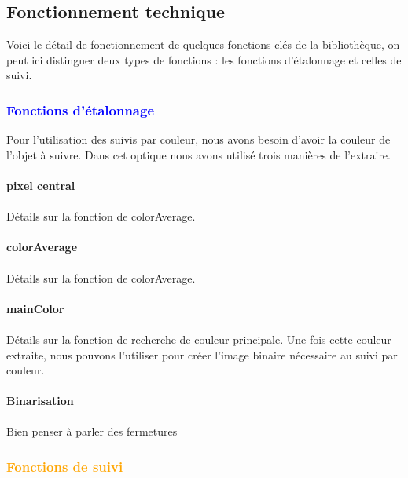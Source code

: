 \documentclass{report}
\begin{document}
				\subsection{Fonctionnement technique}
					Voici le détail de fonctionnement de quelques fonctions clés de la bibliothèque, on peut ici distinguer deux types de fonctions : les fonctions d'étalonnage et celles de suivi.
					\subsubsection{\textcolor{blue}{Fonctions d'étalonnage}}
						Pour l'utilisation des suivis par couleur, nous avons besoin d'avoir la couleur de l'objet à suivre. Dans cet optique nous avons utilisé trois manières de l'extraire.
						\paragraph{pixel central} \paragraph{}
						Détails sur la fonction de colorAverage.
						\paragraph{colorAverage} \paragraph{}
						Détails sur la fonction de colorAverage.
						\paragraph{mainColor} \paragraph{}
						Détails sur la fonction de recherche de couleur principale.
						Une fois cette couleur extraite, nous pouvons l'utiliser pour créer l'image binaire nécessaire au suivi par couleur.
						\paragraph{Binarisation} \paragraph{}
							Bien penser à parler des fermetures
					\subsubsection{\textcolor{orange}{Fonctions de suivi}}
\end{document}
